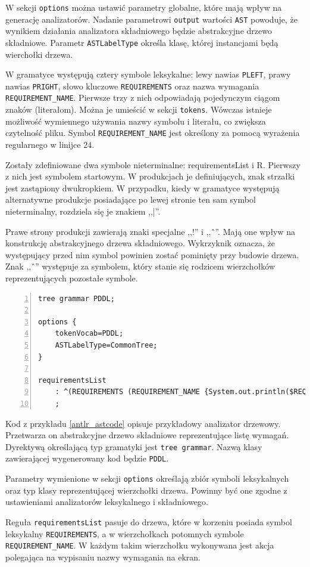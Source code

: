 W sekcji \texttt{options} można ustawić parametry globalne, które mają
wpływ na generację analizatorów. Nadanie parametrowi \texttt{output}
wartości \texttt{AST} powoduje, że wynikiem działania analizatora
składniowego będzie abstrakcyjne drzewo składniowe. Parametr 
\texttt{ASTLabelType} określa klasę, której instancjami będą
 wierchołki drzewa.

W gramatyce występują cztery symbole leksykalne: lewy nawias \texttt{PLEFT}, 
prawy nawias \texttt{PRIGHT}, słowo kluczowe \texttt{REQUIREMENTS} oraz
nazwa wymagania \texttt{REQUIREMENT\_NAME}. Pierwsze trzy z nich 
odpowiadają pojedynczym ciągom znaków (literałom). Można je umieścić
w sekcji \texttt{tokens}. Wówczas istnieje możliwość wymiennego używania 
nazwy symbolu i literału, co zwiększa czytelność pliku. Symbol
\texttt{REQUIREMENT\_NAME} jest określony za pomocą wyrażenia regularnego
w linijce 24.

Zostały zdefiniowane dwa symbole nieterminalne: requirementsList i R.
Pierwszy z nich jest symbolem startowym. W produkcjach
je definiujących, znak strzałki jest zastąpiony dwukropkiem. W przypadku,
kiedy w gramatyce występują alternatywne produkcje posiadające po lewej
stronie ten sam symbol nieterminalny, rozdziela się je znakiem ,,|''.

Prawe strony produkcji zawierają znaki specjalne ,,!'' i ,,\^\ ''. Mają one
wpływ na konstrukcję abstrakcyjnego drzewa składniowego. Wykrzyknik 
oznacza, że występujący przed nim symbol powinien zostać pominięty przy
budowie drzewa. Znak ,,\^\ '' występuje za symbolem, który stanie się rodzicem
wierzchołków reprezentujących pozostałe symbole.

\begin{Code}[h!]
\begin{lstlisting}[label=antlr_astcode, caption=Gramatyka analizatora drzewowego przetwarzającego listę wymagań, numbers=left, frame=single]
tree grammar PDDL;

options {
    tokenVocab=PDDL;
    ASTLabelType=CommonTree;
}

requirementsList
	: ^(REQUIREMENTS (REQUIREMENT_NAME {System.out.println($REQUIREMENT_NAME.text);)+) //$
	;
\end{lstlisting}
\end{Code}

Kod z przykładu \ref{antlr_astcode} opisuje przykładowy
analizator drzewowy. Przetwarza on
abstrakcyjne drzewo składniowe reprezentujące listę wymagań. Dyrektywą 
określającą typ gramatyki jest \texttt{tree grammar}. Nazwą klasy
zawierającej wygenerowany kod będzie \texttt{PDDL}.

Parametry wymienione w sekcji \texttt{options} określają zbiór symboli 
leksykalnych oraz typ klasy reprezentującej wierzchołki drzewa. Powinny
być one zgodne z ustawieniami analizatorów leksykalnego i składniowego.

Reguła \texttt{requirementsList} pasuje do drzewa, które w korzeniu
posiada symbol leksykalny \texttt{REQUIREMENTS}, a w wierzchołkach
potomnych symbole \texttt{REQUIREMENT\_NAME}. W każdym takim wierzchołku 
wykonywana jest akcja polegająca na wypisaniu nazwy wymagania na ekran.
